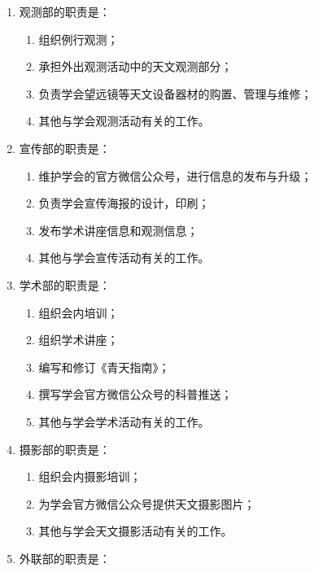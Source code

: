 \begin{enumerate}[resume]
    
    \item 观测部的职责是：
    
    \begin{enumerate}
        \item 组织例行观测；
        \item 承担外出观测活动中的天文观测部分；
        \item 负责学会望远镜等天文设备器材的购置、管理与维修；
        \item 其他与学会观测活动有关的工作。
    \end{enumerate}
    
    \item 宣传部的职责是：
    
    \begin{enumerate}
        \item 维护学会的官方微信公众号，进行信息的发布与升级；
        \item 负责学会宣传海报的设计，印刷；
        \item 发布学术讲座信息和观测信息；
        \item 其他与学会宣传活动有关的工作。
    \end{enumerate}
    
    \item 学术部的职责是：
    
    \begin{enumerate}
        \item 组织会内培训；
        \item 组织学术讲座；
        \item 编写和修订《青天指南》；
        \item 撰写学会官方微信公众号的科普推送；
        \item 其他与学会学术活动有关的工作。
    \end{enumerate}
    
    \item 摄影部的职责是：
    
    \begin{enumerate}
        \item 组织会内摄影培训；
        \item 为学会官方微信公众号提供天文摄影图片；
        \item 其他与学会天文摄影活动有关的工作。
    \end{enumerate}
    
    \item 外联部的职责是：
    

\end{enumerate}
